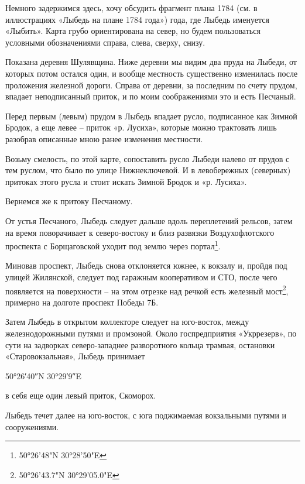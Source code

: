 Немного задержимся здесь, хочу обсудить фрагмент плана 1784 (см. в иллюстрациях «Лыбедь на плане 1784 года») года, где Лыбедь именуется «Лыбить». Карта грубо ориентирована на север, но будем пользоваться условными обозначениями справа, слева, сверху, снизу.

Показана деревня Шулявщина. Ниже деревни мы видим два пруда на Лыбеди, от которых потом остался один, и вообще местность существенно изменилась после проложения железной дороги.    Справа от деревни, за последним по счету прудом, впадает неподписанный приток, и по моим соображениями это и есть Песчаный. 

Перед первым (левым) прудом в Лыбедь впадает русло, подписанное как Зимной Бродок, а еще левее – приток «р. Лусиха», которые можно трактовать лишь разобрав описанные мною ранее изменения местности.

Возьму смелость, по этой карте, сопоставить русло Лыбеди налево от прудов с тем руслом, что было по улице Нижнеключевой. И в левобережных (северных) притоках этого русла и стоит искать Зимной Бродок и «р. Лусиха».


Вернемся же к притоку Песчаному. 
   
От устья Песчаного, Лыбедь следует дальше вдоль переплетений рельсов, затем на время поворачивает к северо-востоку и близ развязки Воздухофлотского проспекта с Борщаговской уходит под землю через портал\footnote{50°26'48"N 30°28'50"E}.

Миновав проспект, Лыбедь снова отклоняется южнее, к вокзалу и, пройдя под улицей Жилянской, следует под гаражным кооперативом и СТО, после чего появляется на поверхности – на этом отрезке над речкой есть железный мост\footnote{50°26'43.7"N 30°29'05.0"E}, примерно на долготе проспект Победы 7Б.

Затем Лыбедь в открытом коллекторе следует на юго-восток, между железнодорожными путями и промзоной. Около госпредприятия «Укррезерв», по сути на задворках северо-западнее разворотного кольца трамвая, остановки «Старовокзальная», Лыбедь принимает

50°26′40″N 30°29′9″E

в себя еще один левый приток, Скоморох.

Лыбедь течет далее на юго-восток, с юга поджимаемая вокзальными путями и сооружениями. 

